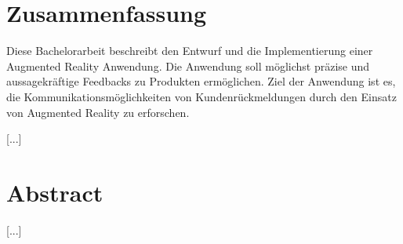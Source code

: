\section*{Zusammenfassung}

Diese Bachelorarbeit beschreibt den Entwurf und die Implementierung einer Augmented Reality Anwendung. Die Anwendung soll möglichst präzise und aussagekräftige Feedbacks zu Produkten ermöglichen.  
Ziel der Anwendung ist es, die Kommunikationsmöglichkeiten von Kundenrückmeldungen durch den Einsatz von Augmented Reality zu erforschen.

[...]

\section*{Abstract}

[...]